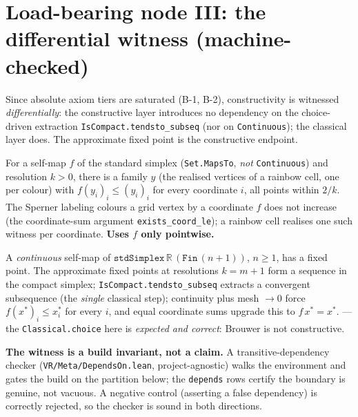 \section{Load-bearing node III: the differential witness (machine-checked)}
\label{sec:brouwer_witness}

Since absolute axiom tiers are saturated (B-1, B-2), constructivity is witnessed
\emph{differentially}: the constructive layer introduces no dependency on the
choice-driven extraction \texttt{IsCompact.tendsto\_subseq} (nor on \texttt{Continuous});
the classical layer does.  The approximate fixed point is the constructive endpoint.

\begin{theorem}
\label{thm:brouwer_approx}
\leanok
{}
For a self-map $f$ of the standard simplex (\texttt{Set.MapsTo}, \emph{not}
\texttt{Continuous}) and resolution $k>0$, there is a family $y$ (the realised
vertices of a rainbow cell, one per colour) with $f(y_i)_i \le (y_i)_i$ for every
coordinate $i$, all points within $2/k$.  The Sperner labeling colours a grid vertex
by a coordinate $f$ does not increase (the coordinate-sum argument
\texttt{exists\_coord\_le}); a rainbow cell realises one such witness per coordinate.
\textbf{Uses $f$ only pointwise.}
\end{theorem}

\begin{theorem}
\label{thm:brouwer_main}
\leanok
{}
A \emph{continuous} self-map of $\texttt{stdSimplex}\,\mathbb{R}\,(\texttt{Fin}\,(n{+}1))$,
$n \ge 1$, has a fixed point.  The approximate fixed points at resolutions $k=m{+}1$
form a sequence in the compact simplex; \texttt{IsCompact.tendsto\_subseq} extracts a
convergent subsequence (the \emph{single} classical step); continuity plus mesh
$\to 0$ force $f(x^\ast)_i \le x^\ast_i$ for every $i$, and equal coordinate sums
upgrade this to $f\,x^\ast = x^\ast$.
 --- the
\texttt{Classical.choice} here is \emph{expected and correct}: Brouwer is not
constructive.
\end{theorem}

\textbf{The witness is a build invariant, not a claim.}  A transitive-dependency
checker (\texttt{VR/Meta/DependsOn.lean}, project-agnostic) walks the
environment and gates the build on the partition below; the \texttt{depends} rows
certify the boundary is genuine, not vacuous.  A negative control (asserting a false
dependency) is correctly rejected, so the checker is sound in both directions.

